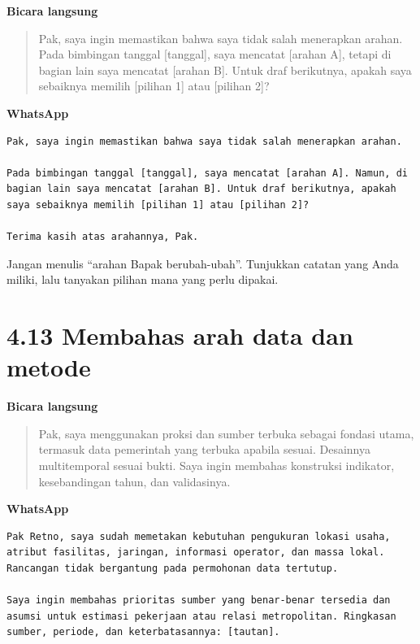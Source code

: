\documentclass[
  indonesian,
]{article}
\renewcommand{\subsection}{\section}
\begin{document}
\textbf{Bicara langsung}

\begin{quote}
Pak, saya ingin memastikan bahwa saya tidak salah menerapkan arahan.
Pada bimbingan tanggal {[}tanggal{]}, saya mencatat {[}arahan A{]},
tetapi di bagian lain saya mencatat {[}arahan B{]}. Untuk draf
berikutnya, apakah saya sebaiknya memilih {[}pilihan 1{]} atau
{[}pilihan 2{]}?
\end{quote}

\textbf{WhatsApp}

\begin{verbatim}
Pak, saya ingin memastikan bahwa saya tidak salah menerapkan arahan.

Pada bimbingan tanggal [tanggal], saya mencatat [arahan A]. Namun, di bagian lain saya mencatat [arahan B]. Untuk draf berikutnya, apakah saya sebaiknya memilih [pilihan 1] atau [pilihan 2]?

Terima kasih atas arahannya, Pak.
\end{verbatim}

Jangan menulis ``arahan Bapak berubah-ubah''. Tunjukkan catatan yang
Anda miliki, lalu tanyakan pilihan mana yang perlu dipakai.

\subsection{4.13 Membahas arah data dan
metode}\label{membahas-arah-data-dan-metode}

\textbf{Bicara langsung}

\begin{quote}
Pak, saya menggunakan proksi dan sumber terbuka sebagai fondasi utama,
termasuk data pemerintah yang terbuka apabila sesuai. Desainnya
multitemporal sesuai bukti. Saya ingin membahas konstruksi indikator,
kesebandingan tahun, dan validasinya.
\end{quote}

\textbf{WhatsApp}

\begin{verbatim}
Pak Retno, saya sudah memetakan kebutuhan pengukuran lokasi usaha, atribut fasilitas, jaringan, informasi operator, dan massa lokal. Rancangan tidak bergantung pada permohonan data tertutup.

Saya ingin membahas prioritas sumber yang benar-benar tersedia dan asumsi untuk estimasi pekerjaan atau relasi metropolitan. Ringkasan sumber, periode, dan keterbatasannya: [tautan].
\end{verbatim}
\end{document}
